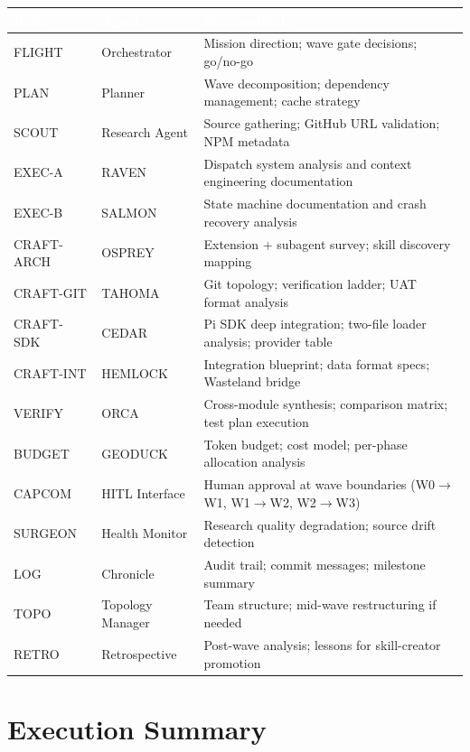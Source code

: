 \documentclass[11pt,letterpaper]{article}
\newcommand{\tableheader}[1]{\textbf{\sffamily\textcolor{white}{#1}}}
\begin{document}
\begin{center}
\begin{tabularx}{\textwidth}{L{2cm}L{3cm}X}
\toprule
{}
\tableheader{Role} & \tableheader{Agent} & \tableheader{Responsibility} \\
\midrule
FLIGHT & Orchestrator & Mission direction; wave gate decisions; go/no-go \\
PLAN & Planner & Wave decomposition; dependency management; cache strategy \\
SCOUT & Research Agent & Source gathering; GitHub URL validation; NPM metadata \\
EXEC-A & RAVEN & Dispatch system analysis and context engineering documentation \\
EXEC-B & SALMON & State machine documentation and crash recovery analysis \\
CRAFT-ARCH & OSPREY & Extension + subagent survey; skill discovery mapping \\
CRAFT-GIT & TAHOMA & Git topology; verification ladder; UAT format analysis \\
CRAFT-SDK & CEDAR & Pi SDK deep integration; two-file loader analysis; provider table \\
CRAFT-INT & HEMLOCK & Integration blueprint; data format specs; Wasteland bridge \\
VERIFY & ORCA & Cross-module synthesis; comparison matrix; test plan execution \\
BUDGET & GEODUCK & Token budget; cost model; per-phase allocation analysis \\
CAPCOM & HITL Interface & Human approval at wave boundaries (W0$\to$W1, W1$\to$W2, W2$\to$W3) \\
SURGEON & Health Monitor & Research quality degradation; source drift detection \\
LOG & Chronicle & Audit trail; commit messages; milestone summary \\
TOPO & Topology Manager & Team structure; mid-wave restructuring if needed \\
RETRO & Retrospective & Post-wave analysis; lessons for skill-creator promotion \\
\bottomrule
\end{tabularx}
\end{center}

\section{Execution Summary}
\end{document}

